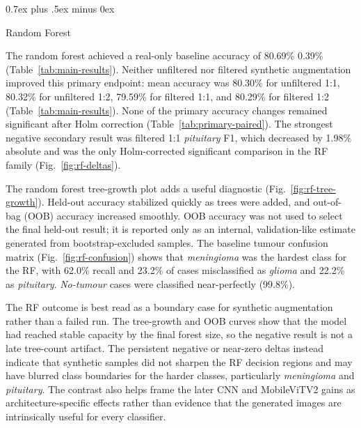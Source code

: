 \documentclass[conference,twoside]{IEEEtran}
\makeatletter
\newcommand{\bodyfont}{\rmfamily}
\def\subsection{\@startsection{subsection}{2}{\z@}{1.5ex plus 1.5ex minus 0.5ex}%
{0.7ex plus .5ex minus 0ex}{\normalfont\normalsize\bodyfont\bfseries\raggedright}}
\makeatother
\begin{document}
\subsection{Random Forest}

The random forest achieved a real-only baseline accuracy of 80.69\% \textpm{} 0.39\% (Table~\ref{tab:main-results}). Neither unfiltered nor filtered synthetic augmentation improved this primary endpoint: mean accuracy was 80.30\% for unfiltered 1:1, 80.32\% for unfiltered 1:2, 79.59\% for filtered 1:1, and 80.29\% for filtered 1:2 (Table~\ref{tab:main-results}). None of the primary accuracy changes remained significant after Holm correction (Table~\ref{tab:primary-paired}). The strongest negative secondary result was filtered 1:1 \textit{pituitary} F1, which decreased by 1.98\% absolute and was the only Holm-corrected significant comparison in the RF family (Fig.~\ref{fig:rf-deltas}).

The random forest tree-growth plot adds a useful diagnostic (Fig.~\ref{fig:rf-tree-growth}). Held-out accuracy stabilized quickly as trees were added, and out-of-bag (OOB) accuracy increased smoothly. OOB accuracy was not used to select the final held-out result; it is reported only as an internal, validation-like estimate generated from bootstrap-excluded samples. The baseline tumour confusion matrix (Fig.~\ref{fig:rf-confusion}) shows that \textit{meningioma} was the hardest class for the RF, with 62.0\% recall and 23.2\% of cases misclassified as \textit{glioma} and 22.2\% as \textit{pituitary}. \textit{No-tumour} cases were classified near-perfectly (99.8\%).

The RF outcome is best read as a boundary case for synthetic augmentation rather than a failed run. The tree-growth and OOB curves show that the model had reached stable capacity by the final forest size, so the negative result is not a late tree-count artifact. The persistent negative or near-zero deltas instead indicate that synthetic samples did not sharpen the RF decision regions and may have blurred class boundaries for the harder classes, particularly \textit{meningioma} and \textit{pituitary}. The contrast also helps frame the later CNN and MobileViTV2 gains as architecture-specific effects rather than evidence that the generated images are intrinsically useful for every classifier.
\end{document}

